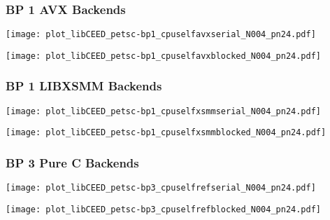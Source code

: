 \documentclass{beamer}
\begin{document}
\begin{frame}
\begin{center}
\frametitle{BP 1 AVX Backends}

\begin{multicols}{2}

\begin{flushleft}
\texttt{[image: plot\_libCEED\_petsc-bp1\_cpuselfavxserial\_N004\_pn24.pdf]}
\end{flushleft}

\begin{flushright}
\texttt{[image: plot\_libCEED\_petsc-bp1\_cpuselfavxblocked\_N004\_pn24.pdf]}
\end{flushright}

\end{multicols}

\end{center}
\end{frame}


\begin{frame}
\begin{center}
\frametitle{BP 1 LIBXSMM Backends}

\begin{multicols}{2}

\begin{flushleft}
\texttt{[image: plot\_libCEED\_petsc-bp1\_cpuselfxsmmserial\_N004\_pn24.pdf]}
\end{flushleft}

\begin{flushright}
\texttt{[image: plot\_libCEED\_petsc-bp1\_cpuselfxsmmblocked\_N004\_pn24.pdf]}
\end{flushright}

\end{multicols}

\end{center}
\end{frame}


\begin{frame}
\begin{center}
\frametitle{BP 3 Pure C Backends}

\begin{multicols}{2}

\begin{flushleft}
\texttt{[image: plot\_libCEED\_petsc-bp3\_cpuselfrefserial\_N004\_pn24.pdf]}
\end{flushleft}

\begin{flushright}
\texttt{[image: plot\_libCEED\_petsc-bp3\_cpuselfrefblocked\_N004\_pn24.pdf]}
\end{flushright}

\end{multicols}

\end{center}
\end{frame}
\end{document}
